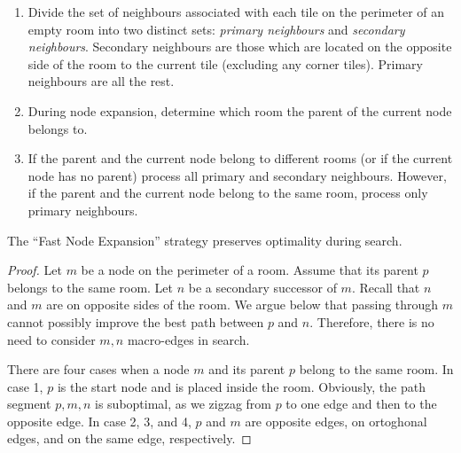 
\begin{enumerate}
\item{Divide the set of neighbours associated with each tile on the perimeter of an empty room into two distinct sets:
\emph{primary neighbours} and \emph{secondary neighbours}.
Secondary neighbours are those which are located on the opposite side of the
room to the current tile  (excluding any corner tiles).
Primary neighbours are all the rest.}
\item{During node expansion, determine which room the parent of the current node belongs to.}
\item{If the parent and the current node belong to different rooms (or if the current node has no parent) 
process all primary and secondary neighbours.
However, if the parent and the current node belong to the same room, process only primary neighbours.}
\end{enumerate}

\begin{lemma}
The ``Fast Node Expansion'' strategy preserves optimality during search.
\end{lemma}
\begin{proof}
Let $m$ be a node on the perimeter of a room. Assume that its parent $p$ belongs
to the same room.
Let $n$ be a secondary successor of $m$.
Recall that $n$ and $m$ are on opposite sides of the room.
We argue below that passing through $m$ cannot possibly improve the 
best path between $p$ and $n$.
Therefore, there is no need to consider $m,n$ macro-edges in search.

There are four cases when a node $m$ and its parent $p$ belong to the
same room. In case 1, $p$ is the start node and is placed inside the room.
Obviously, the path segment $p,m,n$ is suboptimal, as we zigzag from $p$ to one
edge and then to the opposite edge. 
In case 2, 3, and 4, $p$ and $m$ are opposite edges, on ortoghonal edges, and on the same
edge, respectively.
\end{proof}

